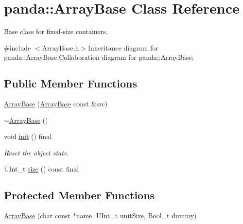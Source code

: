 \hypertarget{classpanda_1_1ArrayBase}{
\section{panda::ArrayBase Class Reference}
\label{classpanda_1_1ArrayBase}
}


Base class for fixed-\/size containers.  


{\ttfamily \#include $<$ArrayBase.h$>$}Inheritance diagram for panda::ArrayBase:Collaboration diagram for panda::ArrayBase:\subsection*{Public Member Functions}
\begin{DoxyCompactItemize}
\item 
\hyperlink{classpanda_1_1ArrayBase_abbf74589a80e3a9b7eb806c3449fd1f7}{ArrayBase} (\hyperlink{classpanda_1_1ArrayBase}{ArrayBase} const \&src)
\item 
\hyperlink{classpanda_1_1ArrayBase_a4cc6e7002b345f1f297a28c6dc1b2fbe}{$\sim$ArrayBase} ()
\item 
void \hyperlink{classpanda_1_1ArrayBase_a4df67e49765f19d5cd8596108eca11ed}{init} () final
\begin{DoxyCompactList}\small\item\em Reset the object state. \item\end{DoxyCompactList}\item 
UInt\_\-t \hyperlink{classpanda_1_1ArrayBase_aecde2cb03cafd4f1ba8ef2cff0abfb4d}{size} () const final
\end{DoxyCompactItemize}
\subsection*{Protected Member Functions}
\begin{DoxyCompactItemize}
\item 
\hyperlink{classpanda_1_1ArrayBase_a9d276f11ddeb4c84cb9f1fa9b3a1c7c9}{ArrayBase} (char const $\ast$name, UInt\_\-t unitSize, Bool\_\-t dummy)
\end{DoxyCompactItemize}
